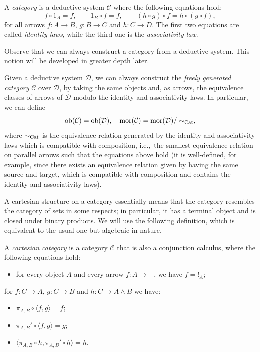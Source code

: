 \begin{definition}[Category]
    A \emph{category} is a deductive system $\mathcal C$ where the following equations hold:
    \[ f \circ 1_A = f, \qquad 1_B \circ f = f, \qquad (h \circ g) \circ f = h \circ (g \circ f),\]
    for all arrows $f : A \to B$, $g : B \to C$ and $h : C \to D$. The first two equations are called \emph{identity laws}, while the third one is the \emph{associativity law}.
\end{definition}

Observe that we can always construct a category from a deductive system. This notion will be developed in greater depth later.

\begin{remark}\label{rem:category-generated-by-deductive-system}
    Given a deductive system $\mathcal D$, we can always construct the \emph{freely generated category} $\mathcal C$ over $\mathcal D$, by taking the same objects and, as arrows, the equivalence classes of arrows of $\mathcal D$ modulo the identity and associativity laws.
    In particular, we can define
    \[ \operatorname{ob}(\mathcal C) = \operatorname{ob}(\mathcal D), \quad \operatorname{mor}(\mathcal C) = \operatorname{mor}(\mathcal D)/\sim_{\textnormal{Cat}}, \]
    where $\sim_{\textnormal{Cat}}$ is the equivalence relation generated by the identity and associativity laws which is compatible with composition,
    i.e.,\ the smallest equivalence relation on parallel arrows such that the equations above hold (it is well-defined, for example, since there exists an equivalence relation given by having the same source and target, which is compatible with composition and contains the identity and associativity laws).
\end{remark}

A cartesian structure on a category essentially means that the category resembles the category of sets in some respects; in particular, it has a terminal object and is closed under binary products.
We will use the following definition, which is equivalent to the usual one but algebraic in nature.

\begin{definition}
    A \emph{cartesian category} is a category $\mathcal C$ that is also a conjunction calculus, where the following equations hold:
    \begin{itemize}
        \item[(\textnormal{CC1})] for every object $A$ and every arrow $f : A \to \top$, we have $f = !_A$;
    \end{itemize}
    for $f : C \to A$, $g : C \to B$ and $h : C \to A \land B$ we have:
    \begin{itemize}
        \item[(\textnormal{CC2a})] $\pi_{A,B} \circ \langle f, g \rangle = f$;
        \item[(\textnormal{CC2b})] $\pi_{A,B}' \circ \langle f, g \rangle = g$;
        \item[(\textnormal{CC2c})] $\langle \pi_{A,B} \circ h, \pi_{A,B}' \circ h\rangle = h$.
    \end{itemize}
\end{definition}

